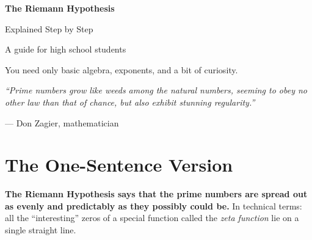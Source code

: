 \documentclass[11pt,a4paper]{article}
\begin{document}
\begin{titlepage}
\centering
\vspace*{3cm}
{\Huge\bfseries\color{keyblue} The Riemann Hypothesis\par}
\vspace{0.5cm}
{\LARGE Explained Step by Step\par}
\vspace{1.5cm}
{\large A guide for high school students\par}
\vspace{0.3cm}
{\normalsize You need only basic algebra, exponents, and a bit of curiosity.\par}
\vspace{2cm}


\vfill
{\large\itshape ``Prime numbers grow like weeds among the natural numbers, seeming to obey no other law than that of chance, but also exhibit stunning regularity.''\par}
\vspace{0.2cm}
{\normalsize --- Don Zagier, mathematician\par}
\vspace{1cm}
\end{titlepage}

\tableofcontents
\newpage

\section{The One-Sentence Version}

\begin{keybox}
\textbf{The Riemann Hypothesis says that the prime numbers are spread out as evenly and predictably as they possibly could be.} In technical terms: all the ``interesting'' zeros of a special function called the \emph{zeta function} lie on a single straight line.
\end{keybox}
\end{document}

